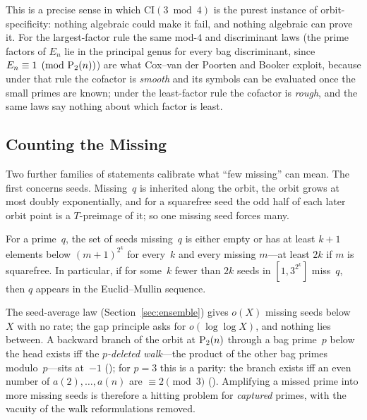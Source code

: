 This is a precise sense in which $\mathrm{CI}(3 \bmod 4)$ is the purest
instance of orbit-specificity: nothing algebraic could make it fail, and
nothing algebraic can prove it.  For the largest-factor rule the same
mod-$4$ and discriminant laws (the prime factors of $E_n$ lie in the
principal genus for every bag discriminant, since $E_n \equiv 1 \pmod{
\mathrm{P}_{2}(n)}$) are what Cox--van der Poorten and Booker exploit, because
under that rule the cofactor is \emph{smooth} and its symbols can be
evaluated once the small primes are known; under the least-factor rule the
cofactor is \emph{rough}, and the same laws say nothing about which factor
is least.

\subsection{Counting the Missing}
\label{sec:counting-missing}

Two further families of statements calibrate what ``few missing'' can
mean.  The first concerns seeds.  Missing~$q$ is inherited along the orbit,
the orbit grows at most doubly exponentially, and for a squarefree seed the
odd half of each later orbit point is a $T$-preimage of it; so one missing
seed forces many.

\begin{theorem}
\label{thm:gap-principle}
For a prime~$q$, the set of seeds missing~$q$ is either empty or has at
least $k{+}1$ elements below $(m{+}1)^{2^k}$ for every~$k$ and every missing
$m$---at least $2k$ if $m$ is squarefree.  In particular, if for some~$k$
fewer than $2k$ seeds in $[1, 3^{2^k}]$ miss~$q$, then $q$ appears in the
Euclid--Mullin sequence.
\end{theorem}

The seed-average law (Section~\ref{sec:ensemble}) gives $o(X)$ missing seeds
below~$X$ with no rate; the gap principle asks for $o(\log\log X)$, and
nothing lies between.  A backward branch of the orbit at $\mathrm{P}_{2}(n)$
through a bag prime~$p$ below the head exists iff the \emph{$p$-deleted
walk}---the product of the other bag primes modulo~$p$---sits at~$-1$
(); for $p = 3$
this is a parity: the branch exists iff an even number of $a(2), \dots,
a(n)$ are $\equiv 2 \pmod 3$
().
Amplifying a missed prime into more missing seeds is therefore a hitting
problem for \emph{captured} primes, with the vacuity of the walk
reformulations removed.

